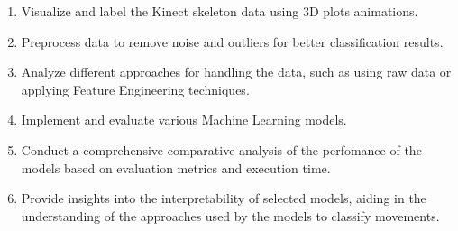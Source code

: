       \begin{enumerate}
         \item Visualize and label the Kinect skeleton data using 3D plots animations.
         \item Preprocess data to remove noise and outliers for better classification results.
         \item Analyze different approaches for handling the data, such as using raw data or applying Feature Engineering techniques.
         \item Implement and evaluate various Machine Learning models. 
         \item Conduct a comprehensive comparative analysis of the perfomance of the models based on evaluation metrics and execution time.
         \item Provide insights into the interpretability of selected models, aiding in the understanding of the approaches used by the models to classify movements.
      \end{enumerate}

\cleardoublepage
